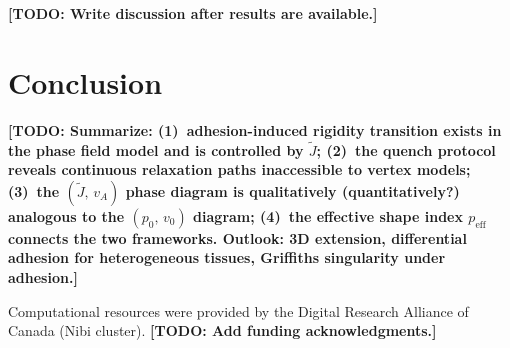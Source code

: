 \documentclass[aps,pre,twocolumn,superscriptaddress,longbibliography]{revtex4-2}
\newcommand{\vA}{v_{\!A}}                  %
\newcommand{\peff}{p_{\mathrm{eff}}}       %
\newcommand{\Jk}{\tilde{J}}                %
\newcommand{\todo}[1]{{\color{red}\textbf{[TODO: #1]}}}
\begin{document}


\todo{Write discussion after results are available.}


\section{Conclusion}
\label{sec:conclusion}

\todo{%
Summarize: (1)~adhesion-induced rigidity transition exists in the phase field
model and is controlled by $\Jk$; (2)~the quench protocol reveals continuous
relaxation paths inaccessible to vertex models; (3)~the $(\Jk,\,\vA)$ phase
diagram is qualitatively (quantitatively?) analogous to the $(p_0,\,v_0)$
diagram; (4)~the effective shape index $\peff$ connects the two frameworks.
Outlook: 3D extension, differential adhesion for heterogeneous tissues,
Griffiths singularity under adhesion.}


\begin{acknowledgments}
Computational resources were provided by the Digital Research Alliance of
Canada (Nibi cluster).
\todo{Add funding acknowledgments.}
\end{acknowledgments}


\end{document}
